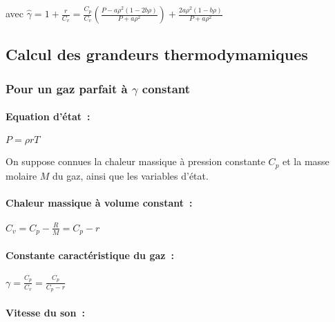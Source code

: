 avec $\hat{\gamma} = 1 + \displaystyle\frac{r}{C_v}
= \displaystyle\frac{C_p}{C_v}
\displaystyle\left(\frac{P-a\rho^2 (1-2b\rho)}{P+a\rho^2}\right)
+ \displaystyle\frac{2a\rho^2 (1-b\rho)}{P+a\rho^2}$



\subsection*{Calcul des grandeurs thermodymamiques}

\subsubsection*{Pour un gaz parfait \`a $\gamma$ constant}

\paragraph{Equation d'\'etat~:}

$P = \rho r T$

On suppose connues la chaleur massique \`a pression constante $C_p$
et la masse molaire $M$ du gaz, ainsi que les variables d'\'etat.

\paragraph{Chaleur massique \`a volume constant~:}

$C_v = C_p - \displaystyle\frac{R}{M} = C_p - r$


\paragraph{Constante caract\'eristique du gaz~:}

$\gamma = \displaystyle\frac{C_p}{C_v} = \displaystyle\frac{C_p}{C_p - r}$


\paragraph{Vitesse du son~:}

